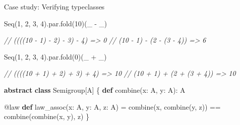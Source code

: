 \documentclass[
  ignorenonframetext,
]{beamer}
\newenvironment{Shaded}{}{}
\newcommand{\CommentTok}[1]{\textcolor[rgb]{0.38,0.63,0.69}{\textit{#1}}}
\newcommand{\DecValTok}[1]{\textcolor[rgb]{0.25,0.63,0.44}{#1}}
\newcommand{\FunctionTok}[1]{\textcolor[rgb]{0.02,0.16,0.49}{#1}}
\newcommand{\KeywordTok}[1]{\textcolor[rgb]{0.00,0.44,0.13}{\textbf{#1}}}
\newcommand{\NormalTok}[1]{#1}
\begin{document}
\begin{frame}[fragile]{Case study: Verifying typeclasses}
\protect\hypertarget{case-study-verifying-typeclasses}{}

\begin{Shaded}
\begin{Highlighting}[]
\NormalTok{Seq(}\DecValTok{1}\NormalTok{, }\DecValTok{2}\NormalTok{, }\DecValTok{3}\NormalTok{, }\DecValTok{4}\NormalTok{).}\FunctionTok{par}\NormalTok{.}\FunctionTok{fold}\NormalTok{(}\DecValTok{10}\NormalTok{)(_ - _)}

\CommentTok{// ((((10 - 1) - 2) - 3) - 4) => 0}
\CommentTok{// (10 - 1) - (2 - (3 - 4))   => 6}
\end{Highlighting}
\end{Shaded}

\end{frame}

\begin{frame}[fragile]

\begin{Shaded}
\begin{Highlighting}[]
\NormalTok{Seq(}\DecValTok{1}\NormalTok{, }\DecValTok{2}\NormalTok{, }\DecValTok{3}\NormalTok{, }\DecValTok{4}\NormalTok{).}\FunctionTok{par}\NormalTok{.}\FunctionTok{fold}\NormalTok{(}\DecValTok{0}\NormalTok{)(_ + _)}

\CommentTok{// ((((10 + 1) + 2) + 3) + 4) => 10}
\CommentTok{// (10 + 1) + (2 + (3 + 4))   => 10}
\end{Highlighting}
\end{Shaded}

\end{frame}

\begin{frame}[fragile]

\begin{Shaded}
\begin{Highlighting}[]
\KeywordTok{abstract} \KeywordTok{class}\NormalTok{ Semigroup[A] \{}
  \KeywordTok{def} \FunctionTok{combine}\NormalTok{(x: A, y: A): A}

\NormalTok{  @law }\KeywordTok{def} \FunctionTok{law_assoc}\NormalTok{(x: A, y: A, z: A) =}
    \FunctionTok{combine}\NormalTok{(x, }\FunctionTok{combine}\NormalTok{(y, z)) == }\FunctionTok{combine}\NormalTok{(}\FunctionTok{combine}\NormalTok{(x, y), z)}
\NormalTok{\}}
\end{Highlighting}
\end{Shaded}

\end{frame}
\end{document}
